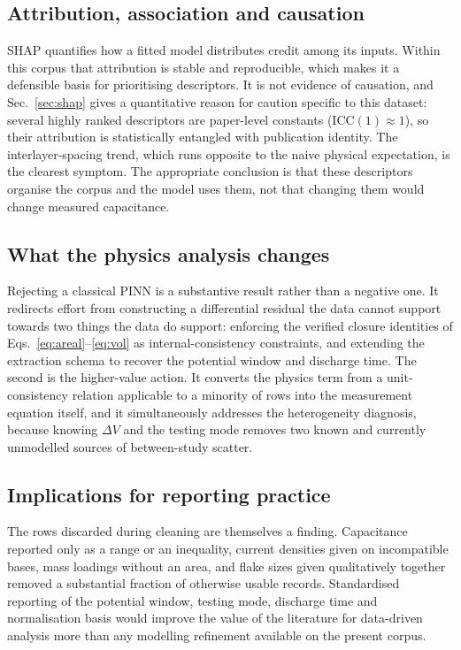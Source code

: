\subsection{Attribution, association and causation}
SHAP quantifies how a fitted model distributes credit among its inputs. Within this corpus
that attribution is stable and reproducible, which makes it a defensible basis for
prioritising descriptors. It is not evidence of causation, and Sec.~\ref{sec:shap} gives a
quantitative reason for caution specific to this dataset: several highly ranked descriptors
are paper-level constants (ICC$(1) \approx 1$), so their attribution is statistically
entangled with publication identity. The interlayer-spacing trend, which runs opposite to the
naive physical expectation, is the clearest symptom. The appropriate conclusion is that these
descriptors organise the corpus and the model uses them, not that changing them would change
measured capacitance.

\subsection{What the physics analysis changes}
Rejecting a classical PINN is a substantive result rather than a negative one. It redirects
effort from constructing a differential residual the data cannot support towards two things
the data do support: enforcing the verified closure identities of
Eqs.~\eqref{eq:areal}--\eqref{eq:vol} as internal-consistency constraints, and extending
the extraction schema to recover the potential window and discharge time. The second is the
higher-value action. It converts the physics term from a unit-consistency relation applicable
to a minority of rows into the measurement equation itself, and it simultaneously addresses
the heterogeneity diagnosis, because knowing $\Delta V$ and the testing mode removes two known
and currently unmodelled sources of between-study scatter.

\subsection{Implications for reporting practice}
The rows discarded during cleaning are themselves a finding. Capacitance reported only as a
range or an inequality, current densities given on incompatible bases, mass loadings without
an area, and flake sizes given qualitatively together removed a substantial fraction of
otherwise usable records. Standardised reporting of the potential window, testing mode,
discharge time and normalisation basis would improve the value of the literature for
data-driven analysis more than any modelling refinement available on the present corpus.
